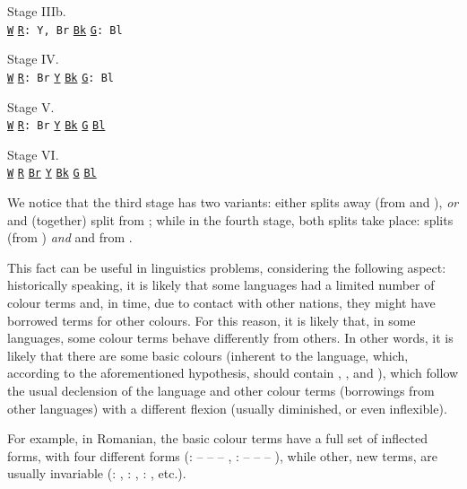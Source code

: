 \begin{refsection}
\begin{framed}
    \quad Stage IIIb. \\ 
    \texttt{\uline{W}} \hfill \texttt{\uline{R}: Y, Br} \hfill \texttt{\uline{Bk}} \hfill \texttt{\uline{G}: Bl}
\end{framed}
\begin{framed}
    \quad Stage IV. \\ 
    \texttt{\uline{W}} \hfill \texttt{\uline{R}: Br} \hfill \texttt{\uline{Y}} \hfill \texttt{\uline{Bk}} \hfill \texttt{\uline{G}: Bl}
\end{framed}
\begin{framed}
    \quad Stage V. \\ 
    \texttt{\uline{W}} \hfill \texttt{\uline{R}: Br} \hfill \texttt{\uline{Y}} \hfill \texttt{\uline{Bk}} \hfill \texttt{\uline{G}} \hfill \texttt{\uline{Bl}}
\end{framed}
\begin{framed}
    \quad Stage VI. \\ 
    \texttt{\uline{W}} \hfill \texttt{\uline{R}} \hfill \texttt{\uline{Br}} \hfill \texttt{\uline{Y}} \hfill \texttt{\uline{Bk}} \hfill \texttt{\uline{G}} \hfill \texttt{\uline{Bl}}
\end{framed}


\pagebreak
We notice that the third stage has two variants: either  splits away (from  and ), \emph{or}  and  (together) split from ; while in the fourth stage, both splits take place:  splits (from ) \emph{and}  and  from .

This fact can be useful in linguistics problems, considering the following aspect: historically speaking, it is likely that some languages had a limited number of colour terms and, in time, due to contact with other nations, they might have borrowed terms for other colours. For this reason, it is likely that, in some languages, some colour terms behave differently from others. In other words, it is likely that there are some basic colours (inherent to the language, which, according to the aforementioned hypothesis, should contain , , and ), which follow the usual declension of the language and other colour terms (borrowings from other languages) with a different flexion (usually diminished, or even inflexible).

For example, in Romanian, the basic colour terms have a full set of inflected forms, with four different forms (:  --  --  -- , :  --  --  -- ), while other, new terms, are usually invariable (: , : , : , etc.).


\end{refsection}
